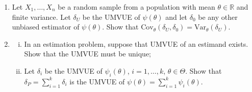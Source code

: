 \documentclass[12pt]{article}
\begin{document}
\begin{enumerate}
\begin{enumerate}[(i)]
        \item $X_{1} \sim \text{Poisson}(\theta)$, $\Theta = (0, \infty)$, $\psi(\theta) = (P_{\theta}(X_{1}=2))^{2}$. Also find the UMVUE of $\psi(\theta) = \cos(\theta)$;
        \item $X_{1} \sim \text{Gamma}(\theta, \alpha_{0})$, $\Theta = (0, \infty)$, $\psi(\theta) = \theta^{r}$, $r > -n\alpha_{0}$, $\alpha_{0}$ is a known positive constant;
        \item $X_{1} \sim \text{Gamma}(\sigma_{0}, \theta)$, $\Theta = (0, \infty)$, $\psi(\theta) = \theta^{r}$, $\sigma_{0}$ is a known positive constant;
        \item $f_{\theta}(x) = a(x) \theta^{x} c(\theta)$, $x = 0, 1, 2, \dots$, $a(x) \ge 0$, $\Theta = (0, \infty)$, $\psi(\theta) = \theta^{r}$, $r$ is a positive integer, $c(\theta)$ is a normalizing factor for the p.m.f.;
        \item $X_{1}$ follows discrete uniform distribution on the set $\{1, 2, \dots, \theta\}$, $\Theta = \{1, 2, \dots\}$, $\psi(\theta)$ is an arbitrary real-valued function defined on $\Theta$;
        \item $X_{1}$ follows discrete uniform distribution on the set $\{1, 2, \dots, \theta\}$, $\Theta = \{1, 2, \dots\} \setminus \{\theta_{0}\}$, $\theta_{0}$ is a fixed positive integer and $\psi(\theta)$ is an arbitrary real-valued function defined on $\Theta$.
    \end{enumerate}

    \item Let $X_{1}, \dots, X_{n}$ be a random sample from a population with mean $\theta \in \mathbb{R}$ and finite variance. Let $\delta_{U}$ be the UMVUE of $\psi(\theta)$ and let $\delta_{0}$ be any other unbiased estimator of $\psi(\theta)$. Show that $\text{Cov}_{\theta}(\delta_{U}, \delta_{0}) = \text{Var}_{\theta}(\delta_{U})$.

    \item 
    \begin{enumerate}[(i)]
        \item In an estimation problem, suppose that UMVUE of an estimand exists. Show that the UMVUE must be unique;
        \item Let $\delta_{i}$ be the UMVUE of $\psi_{i}(\theta)$, $i = 1, \dots, k$, $\theta \in \Theta$. Show that $\delta_{P} = \sum_{i=1}^{k} \delta_{i}$ is the UMVUE of $\psi(\theta) = \sum_{i=1}^{k} \psi_{i}(\theta)$.
    \end{enumerate}


\end{enumerate}
\end{document}
